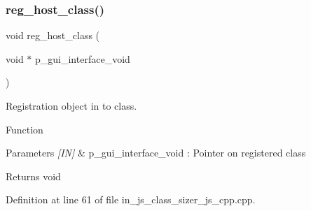 \subsubsection{reg\_host\_class()}
{\footnotesize\ttfamily void reg\+\_\+host\+\_\+class (\begin{DoxyParamCaption}\item[{void $\ast$}]{p\+\_\+gui\+\_\+interface\+\_\+void }\end{DoxyParamCaption})}



Registration object in to class. 

Function
\begin{DoxyParams}{Parameters}
{\em \mbox{[}\+I\+N\mbox{]}} & p\+\_\+gui\+\_\+interface\+\_\+void \+: Pointer on registered class \\
\hline
\end{DoxyParams}
\begin{DoxyReturn}{Returns}
void 
\end{DoxyReturn}


Definition at line 61 of file in\+\_\+js\+\_\+class\+\_\+sizer\+\_\+js\+\_\+cpp.\+cpp.

